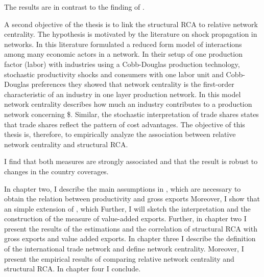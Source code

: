  The results are in contrast to the finding of \textcite{Koopman}. \par
 A second objective of the thesis is to link the structural RCA to relative network centrality.
 The hypothesis is motivated by the literature on shock propagation in networks.
  In this literature \textcite{acemoglu2012} formulated a reduced form model of interactions among many economic actors in a network.
    In their setup of one production factor (labor) with industries using a Cobb-Douglas production technology, stochastic productivity shocks and consumers with one labor unit and  Cobb-Douglas preferences they showed that network centrality is the first-order characteristic of an industry in one layer production network.
    In this model network centrality describes how much an industry contributes to a production network concerning \$.
     Similar, the stochastic interpretation of trade shares states that trade shares reflect the pattern of cost advantages.
     The objective of this thesis is, therefore, to empirically analyze the association between relative network centrality and structural RCA. \par
I find that both measures are strongly associated and that the result is robust to changes in the country coverages.%
 \par %
In chapter two, I describe the main assumptions in \textcite{costinot}, which are necessary to obtain the relation between productivity and gross exports
Moreover, I show that an simple extension of \textcite{costinot}, which
 Further, I will sketch the interpretation and the construction of the measure of value-added exports.
  Further, in chapter two I present the results of the estimations and the correlation of structural RCA with gross exports and value added exports.
  In chapter three I describe the definition of the international trade network and define network centrality.
  Moreover, I present the empirical results of comparing relative network centrality and structural RCA.
  In chapter four I conclude.
\endinput
